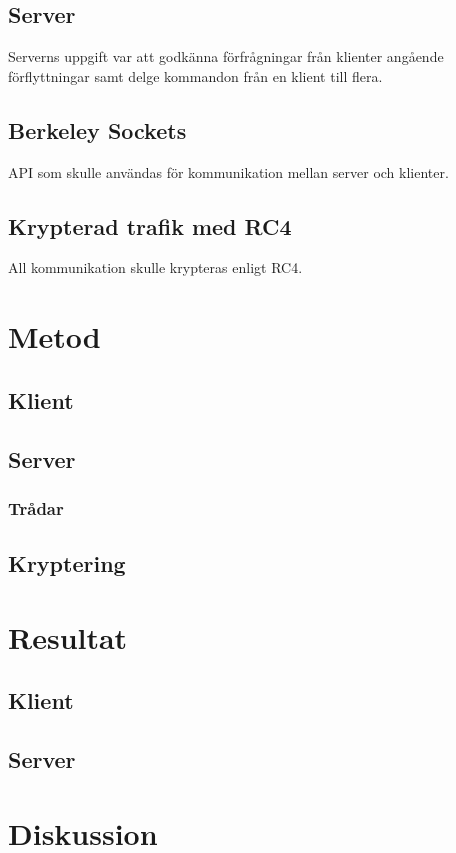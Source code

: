 \documentclass[10pt, titlepage, oneside, a4paper]{article}
\begin{document}
		\subsection{Server}
		Serverns uppgift var att godkänna förfrågningar från klienter angående förflyttningar samt delge kommandon från en klient till flera.
		
		\subsection{Berkeley Sockets}
		API som skulle användas för kommunikation mellan server och klienter.

		\subsection{Krypterad trafik med RC4}
		All kommunikation skulle krypteras enligt RC4.
		 
	
	\section{Metod}%
		\subsection{Klient} %
		\subsection{Server} %
			\subsubsection{Trådar}
			
		\subsection{Kryptering}
		
	\section{Resultat}%
		\subsection{Klient}
		\subsection{Server}
		
	\section{Diskussion}%
  
    
\end{document}
